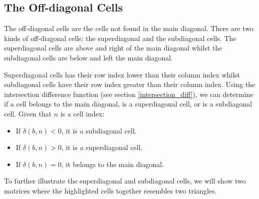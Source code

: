 \documentclass[letterpaper, twoside,12pt]{article}
\begin{document}
    \subsection{The Off-diagonal Cells} \label{offdiagonal_cells}
    The off-diagonal cells are the cells not found in the main diagonal. There are two kinds of off-diagonal cells: the superdiagonal and the subdiagonal cells. The superdiagonal cells are above and right of the main diagonal whilst the subdiagonal cells are below and left the main diagonal.

    Superdiagonal cells has their row index lower than their column index whilst subdiagonal cells have their row index greater than their column index. Using the intersection difference function (see section \ref{intersection_diff}), we can determine if a cell belongs to the main diagonal, is a superdiagonal cell, or is a subdiagonal cell. Given that $n$ is a cell index:
    \begin{itemize}
        \item If $\delta(b,n) < 0$, it is a subdiagonal cell.
        \item If $\delta(b,n) > 0$, it is a superdiagonal cell.
        \item If $\delta(b,n) = 0$, it belongs to the main diagonal.
    \end{itemize}

    To further illustrate the superdiagonal and subdiagonal cells, we will show two matrices where the highlighted cells together resembles two triangles.
\end{document}
